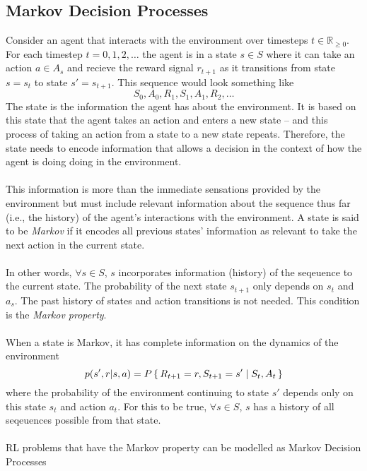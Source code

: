 \subsection{Markov Decision Processes}
Consider an agent that interacts with the environment over timesteps 
$t \in \mathbb{R}_{\geq 0}$. For each timestep $t=0,1,2,\ldots$ the agent is in a state
$s \in S$ where it can take an action $a \in A_s$ and recieve the reward signal $r_{t+1}$ 
as it transitions from state $s=s_t$ to state $s'=s_{t+1}$. This sequence would look
something like
\begin{equation}
    S_0, A_0, R_1, S_1, A_1, R_2, \ldots 
\end{equation}
The state is the information the agent has about the environment. It is based on this
state that the agent takes an action and enters a new state -- and this
process of taking an action from a state to a new state repeats. Therefore, the state
needs to encode information that allows a decision in the context of how the agent is doing 
doing in the environment.
\\\\
This information is more than the immediate sensations provided by the environment but must
include relevant information about the sequence thus far (i.e., the history) of the agent's 
interactions with the environment. A state is said to be \textit{Markov} if it encodes
all previous states' information as relevant to take the next action in the current state.
\\\\
In other words, $\forall s \in S$, $s$ incorporates information (history) of the seqeuence
to the current state.
The probability of the next state $s_{t+1}$ only depends on $s_{t}$ and $a_s$. 
The past history of states and action transitions is not needed.
This condition is the \textit{Markov property}. 
\\\\
When a state is Markov, it has complete information on the dynamics of the 
environment
\begin{equation}
    p(s', r | s, a) = P\set{R_{t+1}=r, S_{t+1}=s'|S_t, A_t}
\end{equation} where the probability of the environment continuing to state 
$s'$ depends only on this state $s_{t}$ and action $a_{t}$. 
For this to be true, $\forall s \in S$, $s$ has a history of all seqeuences 
possible from that state. 
\\\\
RL problems that have the Markov property can be modelled as Markov Decision Processes 
